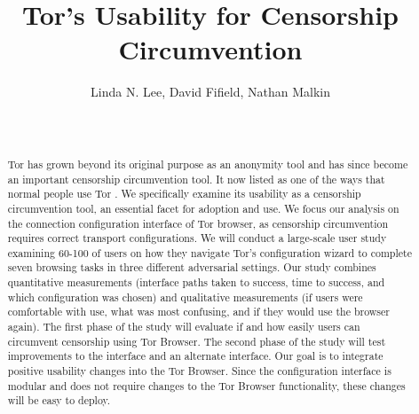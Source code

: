 \documentclass{template}
\begin{document}
\title{Tor's Usability for Censorship Circumvention}
\author{
 \alignauthor Linda N. Lee, David Fifield, Nathan Malkin \\
   \vspace{0.5em}
    \\
   \\
}
\maketitle

\begin{abstract}
Tor has grown beyond its original purpose as an anonymity tool and has 
since become an important censorship circumvention tool. It now listed 
as one of the ways that normal people use Tor \cite{whotor}.
We specifically examine its usability as a censorship circumvention tool,
an essential facet for adoption and use.  
We focus our analysis on the connection configuration interface of Tor browser,
as censorship circumvention requires correct transport configurations.
We will conduct a large-scale user study examining 60-100 of users 
on how they navigate Tor's configuration wizard to complete seven browsing tasks 
in three different adversarial settings. Our study combines quantitative measurements (interface
paths taken to success, time to success, and which configuration was chosen) and
qualitative measurements (if users were comfortable with use, what was most confusing, and 
if they would use the browser again). The first phase of the study will evaluate if and how 
easily users can circumvent censorship using Tor Browser. The second phase
of the study will test improvements to the interface and an alternate interface. 
Our goal is to integrate positive usability changes into the Tor Browser. Since
the configuration interface is modular and does not require changes to the Tor Browser
functionality, these changes will be easy to deploy. 

\end{abstract}

\end{document}
